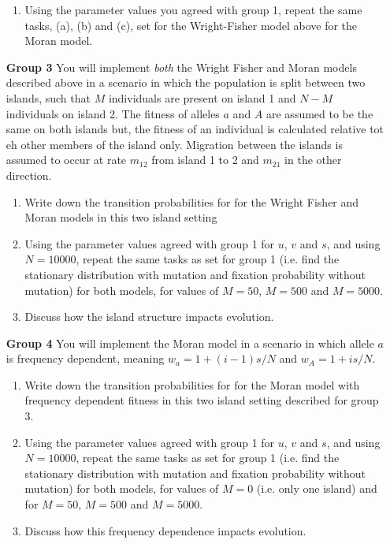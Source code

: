 \documentclass[12pt]{article}
\begin{document}
\begin{enumerate}
\begin{enumerate}
\item Using the parameter values you agreed with group 1, repeat the same tasks, (a), (b) and (c), set for the Wright-Fisher model above for the Moran model.
\end{enumerate}

\item[\bf Group 3] 
You will implement \emph{both} the Wright Fisher and Moran models described above in a scenario in which the population is split between two islands, such that $M$ individuals are present on island 1 and $N-M$ individuals on island 2. The fitness of alleles $a$ and $A$ are assumed to be the same on both islands but, the fitness of an individual is calculated relative tot eh other members of the island only. Migration between the islands is assumed to occur at rate $m_{12}$ from island 1 to 2 and $m_{21}$ in the other direction.

\begin{enumerate}
\item Write down the transition probabilities for for the Wright Fisher and Moran models in this two island setting
\item Using the parameter values agreed with group 1 for $u$, $v$ and $s$, and using $N=10000$, repeat the same tasks as set for group 1 (i.e. find the stationary distribution with mutation and fixation probability without mutation) for both models, for values of $M=50$, $M=500$ and $M=5000$. 
\item Discuss how the island structure impacts evolution.
\end{enumerate}

\item[\bf Group 4] 
You will implement the Moran model in a scenario in which allele $a$ is frequency dependent, meaning $w_a=1+(i-1)s/N$ and $w_A=1+is/N$.


\begin{enumerate}
\item Write down the transition probabilities for for the Moran model with frequency dependent fitness in this two island setting described for group 3.
\item Using the parameter values agreed with group 1 for $u$, $v$ and $s$, and using $N=10000$, repeat the same tasks as set for group 1 (i.e. find the stationary distribution with mutation and fixation probability without mutation) for both models, for values of $M=0$ (i.e. only one island) and for $M=50$, $M=500$ and $M=5000$. 
\item Discuss how this frequency dependence impacts evolution.
\end{enumerate}

\end{enumerate}
\end{document}
